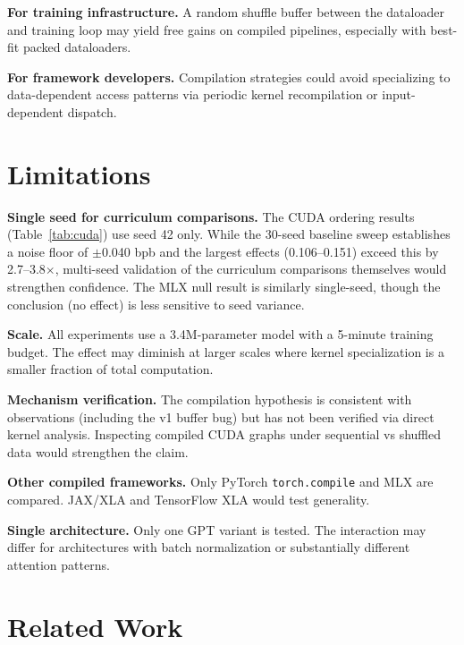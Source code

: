 \documentclass{article}
\begin{document}
\textbf{For training infrastructure.}
A random shuffle buffer between the dataloader and training loop may
yield free gains on compiled pipelines, especially with best-fit
packed dataloaders.

\textbf{For framework developers.}
Compilation strategies could avoid specializing to data-dependent
access patterns via periodic kernel recompilation or input-dependent
dispatch.

\section{Limitations}\label{sec:limitations}

\textbf{Single seed for curriculum comparisons.}
The CUDA ordering results (Table~\ref{tab:cuda}) use seed 42 only.
While the 30-seed baseline sweep establishes a noise floor of
$\pm$0.040 bpb and the largest effects (0.106--0.151) exceed this by
2.7--3.8$\times$, multi-seed validation of the curriculum comparisons
themselves would strengthen confidence. The MLX null result is similarly
single-seed, though the conclusion (no effect) is less sensitive to
seed variance.

\textbf{Scale.} All experiments use a 3.4M-parameter model with a
5-minute training budget. The effect may diminish at larger scales where
kernel specialization is a smaller fraction of total computation.

\textbf{Mechanism verification.} The compilation hypothesis is
consistent with observations (including the v1 buffer bug) but has not
been verified via direct kernel analysis. Inspecting compiled CUDA
graphs under sequential vs shuffled data would strengthen the claim.

\textbf{Other compiled frameworks.} Only PyTorch \texttt{torch.compile}
and MLX are compared. JAX/XLA and TensorFlow XLA would test generality.

\textbf{Single architecture.} Only one GPT variant is tested.
The interaction may differ for architectures with batch normalization
or substantially different attention patterns.

\section{Related Work}\label{sec:related}
\end{document}
